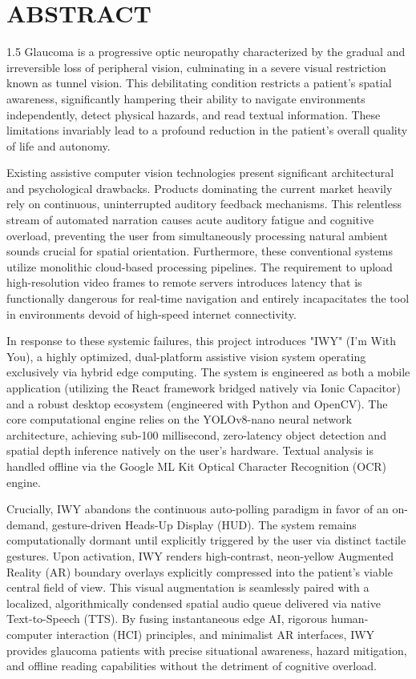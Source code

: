 \documentclass[12pt, a4paper]{report}
\begin{document}
\chapter*{ABSTRACT}
\begin{spacing}{1.5}
Glaucoma is a progressive optic neuropathy characterized by the gradual and irreversible loss of peripheral vision, culminating in a severe visual restriction known as tunnel vision. This debilitating condition restricts a patient's spatial awareness, significantly hampering their ability to navigate environments independently, detect physical hazards, and read textual information. These limitations invariably lead to a profound reduction in the patient's overall quality of life and autonomy.

Existing assistive computer vision technologies present significant architectural and psychological drawbacks. Products dominating the current market heavily rely on continuous, uninterrupted auditory feedback mechanisms. This relentless stream of automated narration causes acute auditory fatigue and cognitive overload, preventing the user from simultaneously processing natural ambient sounds crucial for spatial orientation. Furthermore, these conventional systems utilize monolithic cloud-based processing pipelines. The requirement to upload high-resolution video frames to remote servers introduces latency that is functionally dangerous for real-time navigation and entirely incapacitates the tool in environments devoid of high-speed internet connectivity.

In response to these systemic failures, this project introduces "IWY" (I'm With You), a highly optimized, dual-platform assistive vision system operating exclusively via hybrid edge computing. The system is engineered as both a mobile application (utilizing the React framework bridged natively via Ionic Capacitor) and a robust desktop ecosystem (engineered with Python and OpenCV). The core computational engine relies on the YOLOv8-nano neural network architecture, achieving sub-100 millisecond, zero-latency object detection and spatial depth inference natively on the user's hardware. Textual analysis is handled offline via the Google ML Kit Optical Character Recognition (OCR) engine.

Crucially, IWY abandons the continuous auto-polling paradigm in favor of an on-demand, gesture-driven Heads-Up Display (HUD). The system remains computationally dormant until explicitly triggered by the user via distinct tactile gestures. Upon activation, IWY renders high-contrast, neon-yellow Augmented Reality (AR) boundary overlays explicitly compressed into the patient's viable central field of view. This visual augmentation is seamlessly paired with a localized, algorithmically condensed spatial audio queue delivered via native Text-to-Speech (TTS). By fusing instantaneous edge AI, rigorous human-computer interaction (HCI) principles, and minimalist AR interfaces, IWY provides glaucoma patients with precise situational awareness, hazard mitigation, and offline reading capabilities without the detriment of cognitive overload.
\end{spacing}
\end{document}
